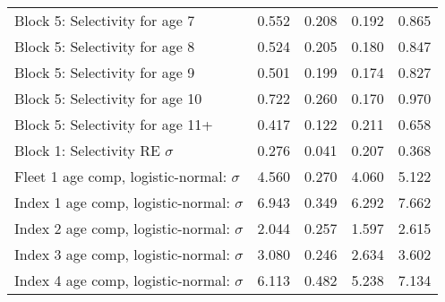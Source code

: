 \documentclass[
]{article}
\begin{document}
\begin{landscape}
\begin{longtable}[t]{lrrrr}
\addlinespace
Block 5: Selectivity for age 7 & 0.552 & 0.208 & 0.192 & 0.865\\
Block 5: Selectivity for age 8 & 0.524 & 0.205 & 0.180 & 0.847\\
Block 5: Selectivity for age 9 & 0.501 & 0.199 & 0.174 & 0.827\\
Block 5: Selectivity for age 10 & 0.722 & 0.260 & 0.170 & 0.970\\
Block 5: Selectivity for age 11+ & 0.417 & 0.122 & 0.211 & 0.658\\
\addlinespace
Block 1: Selectivity RE $\sigma$ & 0.276 & 0.041 & 0.207 & 0.368\\
Fleet 1 age comp, logistic-normal: $\sigma$ & 4.560 & 0.270 & 4.060 & 5.122\\
Index 1 age comp, logistic-normal: $\sigma$ & 6.943 & 0.349 & 6.292 & 7.662\\
Index 2 age comp, logistic-normal: $\sigma$ & 2.044 & 0.257 & 1.597 & 2.615\\
Index 3 age comp, logistic-normal: $\sigma$ & 3.080 & 0.246 & 2.634 & 3.602\\
\addlinespace
Index 4 age comp, logistic-normal: $\sigma$ & 6.113 & 0.482 & 5.238 & 7.134\\*
\end{longtable}
\end{landscape}
\end{document}
